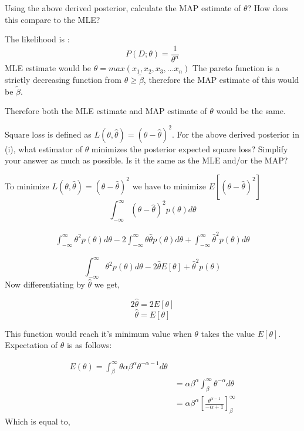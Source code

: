 \documentclass[solution,addpoints,12pt]{exam}
\begin{document}
\begin{questions}
\begin{parts}
\begin{subparts}
\begin{solution}
\end{solution}

\subpart[1\half] Using the above derived posterior, calculate the MAP estimate of $\theta$? How does this compare to the MLE?
\begin{solution}

The likelihood is :  
\[
  P(D;\theta) = \frac{1}{\theta^{n}}
\]
MLE estimate would be $\theta = max(x_1, x_2, x_3, \ldots x_n)$
The pareto function is a strictly decreasing function from $\theta \geq \widetilde{\beta}$, 
therefore the MAP estimate of this would be $\widetilde{\beta}$. 

Therefore both the MLE estimate and MAP estimate of $\theta$ would be the same.  

\end{solution}

\subpart[2] Square loss is defined as $L(\theta, \hat{\theta}) = (\theta - \hat{\theta})^2$. For the above derived posterior in (i), 
what estimator of $\theta$ minimizes the posterior expected square loss? Simplify your answer as much as possible. Is it the same as the MLE and/or the MAP?
\begin{solution}

To minimize  $L(\theta, \hat{\theta}) = (\theta - \hat{\theta})^2$ we have to minimize $E[(\theta - \hat{\theta})^{2}]$ 
\[
  \int_{-\infty}^{\infty} (\theta - \hat{\theta})^2 p(\theta)d\theta 
\]

\begin{align*}
  \int_{-\infty}^{\infty} \theta^{2} p(\theta) d\theta -  2\int_{-\infty}^{\infty} \theta \hat{\theta} p(\theta) d\theta + \int_{-\infty}^{\infty} \hat{\theta}^2 p(\theta) d\theta 
\end{align*}

\[
  \int_{-\infty}^{\infty} \theta^{2} p(\theta) d\theta -  2 \hat{\theta} E[\theta] + \hat{\theta}^2 p(\theta) 
\]
Now differentiating by $\hat{\theta}$ we get, 

\[
  2\hat{\theta} = 2E[\theta]  
\]
\[
  \hat{\theta} = E[\theta]
\]

This function would reach it's minimum value when $\theta$ takes the value $E[\theta]$. 
Expectation of $\theta$ is as follows:

\begin{align*}
  E(\theta) = \int_{\beta}^{\infty} \theta \alpha \beta ^{\alpha}\theta^{-\alpha-1} d\theta \\ 
  &= \alpha\beta^{\alpha} \int_{\beta}^{\infty} \theta^{-\alpha} d\theta \\ 
  &= \alpha \beta^{\alpha} \left[ \frac{\theta^{\alpha-1}}{-\alpha +1} \right]^{\infty}_{\beta}
\end{align*}
Which is equal to, \\ 


\end{solution}
\end{subparts}
\end{parts}
\end{questions}
\end{document}
